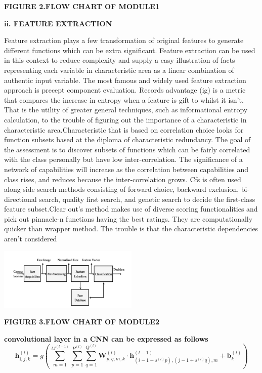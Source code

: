 \documentclass[journal]{IEEEtran} %
\begin{document}
\textbf\textbf{{\textbf{FIGURE 2.FLOW CHART OF MODULE1}}
}


\vspace\textbf{\textbf{ii. FEATURE EXTRACTION}}

Feature extraction plays a few transformation of original features to generate different functions which can be extra significant. 
Feature extraction can be used in this context to reduce complexity and supply a easy illustration of facts representing each variable in characteristic area as a linear combination of authentic input variable. The most famous and widely used feature extraction approach is precept component evaluation.
Records advantage (ig) is a metric that compares the increase in entropy when a feature is gift to whilst it isn't. That is the utility of greater general techniques, such as informational entropy calculation, to the trouble of figuring out the importance of a characteristic in characteristic area.Characteristic that is based on correlation choice looks for function subsets based at the diploma of characteristic redundancy. The goal of the assessment is to discover subsets of functions which can be fairly correlated with the class personally but have low inter-correlation. The significance of a network of capabilities will increase as the correlation between capabilities and class rises, and reduces because the inter-correlation grows. Cfs is often used along side search methods consisting of forward choice, backward exclusion, bi-directional search, quality first search, and genetic search to decide the first-class feature subset.Clear out’s method makes use of diverse scoring functionalities and pick out pinnacle-n functions having the best ratings. They are computationally quicker than wrapper method. The trouble is that the characteristic dependencies aren't considered

\includegraphics[width=0.5\textwidth]{module2.PNG}

\textbf\textbf{{\textbf{\vspace{10pt}FIGURE 3.FLOW CHART OF MODULE2}}
}

\textbf{convolutional layer in a CNN can be expressed as follows}
\begin{equation*}
    \mathbf{h}^{(l)}_{i,j,k} = g \left(\sum_{m=1}^{M^{(l-1)}}\sum_{p=1}^{P^{(l)}}\sum_{q=1}^{Q^{(l)}}\mathbf{W}^{(l)}_{p,q,m,k} \cdot \mathbf{h}^{(l-1)}_{(i-1+s^{(l)}p),(j-1+s^{(l)}q),m} + \mathbf{b}^{(l)}_{k} \right)
\end{equation*}
\end{document}
